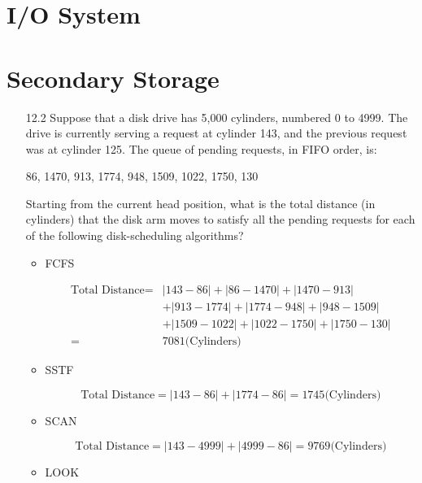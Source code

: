 \chapter{I/O System}


\chapter{Secondary Storage}

\begin{enumerate}
    \item [12.2] Suppose that a disk drive has 5,000 cylinders, numbered 0 to 4999. The drive is currently serving a request at cylinder 143, and the previous request was at cylinder 125. The queue of pending requests, in FIFO order, is:
    
         86, 1470, 913, 1774, 948, 1509, 1022, 1750, 130
    
    Starting from the current head position, what is the total distance (in cylinders) that the disk arm moves to satisfy all the pending requests for each of the following disk-scheduling algorithms?
    \begin{itemize}
        \item FCFS
        
        \begin{equation*}
            \begin{split}
                \text{Total Distance} 
                 = & |143 - 86| + |86 - 1470| + |1470 - 913| \\
                   & + |913 - 1774| + |1774 - 948| + |948 - 1509| \\
                   & + |1509 - 1022| + |1022 - 1750| + |1750 - 130| \\
                 = & 7081 \text{(Cylinders)}
            \end{split}
        \end{equation*}

        \item SSTF
        
        $$
        \text{Total Distance} = |143 - 86| + |1774 - 86| = 1745 \text{(Cylinders)}
        $$
        
        \item SCAN

        $$
        \text{Total Distance} = |143 - 4999| + |4999 - 86| = 9769 \text{(Cylinders)}
        $$
        
        
        \item LOOK
        

\end{itemize}
\end{enumerate}

